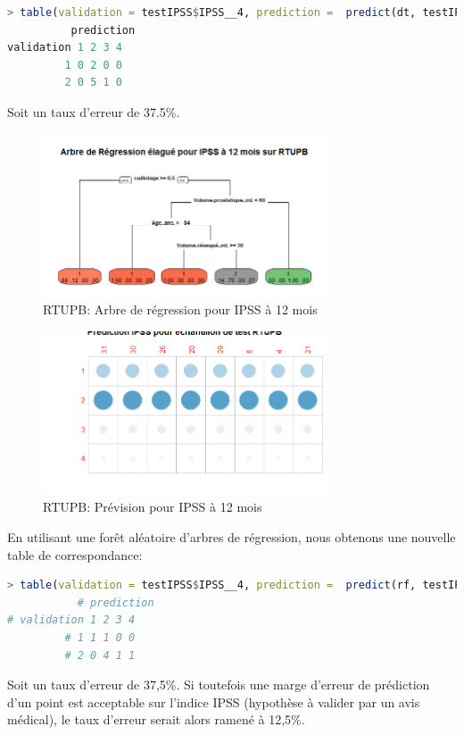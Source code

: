 \begin{lstlisting}[language=R]
> table(validation = testIPSS$IPSS__4, prediction =  predict(dt, testIPSS, type="class"))
          prediction
validation 1 2 3 4
         1 0 2 0 0
         2 0 5 1 0
\end{lstlisting}
Soit un taux d'erreur de 37.5\%.

\begin{figure}[H]
\centering
\includegraphics[width=0.75\textwidth]{../Fig/RTUPB/rtupb-regtree-ipss12.png}
\caption{RTUPB: Arbre de régression pour IPSS à 12 mois}
\label{fig-rtupb-regtree-ipss12}
\end{figure}


\begin{figure}[H]
\centering
\includegraphics[width=0.75\textwidth]{../Fig/RTUPB/rtupb-regtree-predict-ipss12.png}
\caption{RTUPB: Prévision pour IPSS à 12 mois}
\label{fig-rtupb-regtree-predict-ipss12}
\end{figure}

En utilisant une forêt aléatoire d'arbres de régression, nous obtenons une nouvelle table de correspondance:
\begin{lstlisting}[language=R]
> table(validation = testIPSS$IPSS__4, prediction =  predict(rf, testIPSS))
           # prediction
# validation 1 2 3 4
         # 1 1 1 0 0
         # 2 0 4 1 1
\end{lstlisting}
Soit un taux d'erreur de 37,5\%. Si toutefois une marge d'erreur de prédiction d'un point est acceptable sur l'indice IPSS (hypothèse à valider par un avis médical), le taux d'erreur serait alors ramené à 12,5\%.

